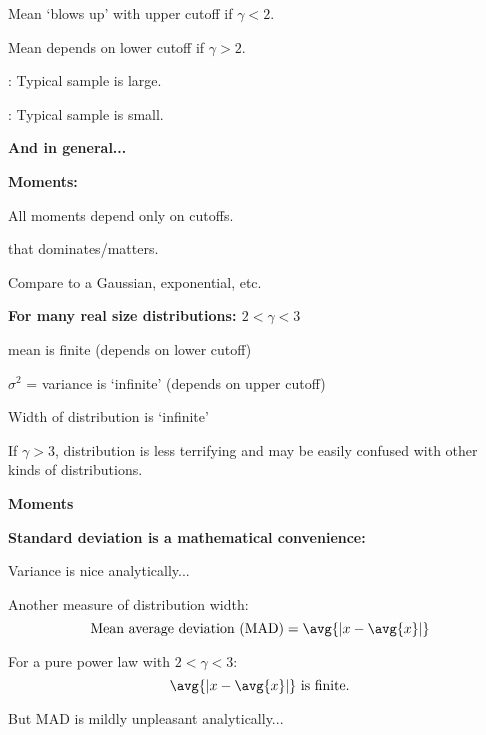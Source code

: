     
      Mean `blows up' with upper cutoff if $\gamma < 2$.
    
      Mean depends on lower cutoff if $\gamma > 2$.
    
      : Typical sample is large.
    
      : Typical sample is small.
    
  




  \textbf{And in general...}

  \textbf{Moments:}
    
    
      All moments depend only on cutoffs.
    
       that dominates/matters.
    
      Compare to a Gaussian, exponential, etc.
    
  

  \textbf{For many real size distributions: $ 2 < \gamma < 3 $}
    
     
      mean is finite (depends on lower cutoff)
     
      $\sigma^2$ = variance is `infinite' (depends on upper cutoff)    
     
      Width of distribution is `infinite'    
    
      If $\gamma > 3$, distribution is less terrifying and may
      be easily confused with other kinds of distributions.
    
  



  \textbf{Moments}

  \textbf{Standard deviation is a mathematical convenience:}
    
     
      Variance is nice analytically...
     
      Another measure of distribution width:
      $$
      \mbox{Mean average deviation (MAD)} =
      \avg{\left| x - \avg{x} \right|}
      $$
    
      For a pure power law with $2 < \gamma < 3$:
      $$\avg{\left| x - \avg{x} \right|} \ \mbox{is finite.}$$
    
      But MAD is mildly unpleasant analytically...
    
